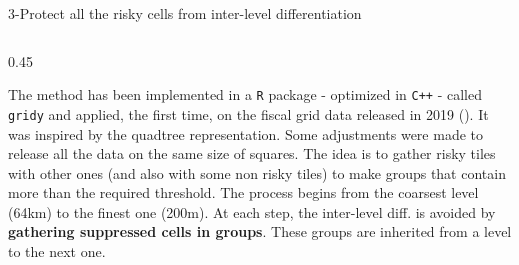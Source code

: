 \documentclass[final,xcolor={dvipsnames,svgnames,table}]{beamer}
\newlength{\colwidth}
\begin{document}
\begin{frame}[fragile,t]
\begin{columns}[t]
\begin{column}{\colwidth}

        


\vspace{1cm}

 \begin{block}{3-Protect all the risky cells from inter-level differentiation}
    \vspace{0.25cm}
    \begin{columns}
        \begin{column}{0.45\colwidth}
            \justifying
            
            The method has been implemented in a \texttt{R} package - optimized in \texttt{C++} - called \texttt{gridy} and applied, the first time, on the fiscal grid data released in 2019 (\cite{gs2018}). It was inspired by the quadtree representation. Some adjustments were made to release all the data on the same size of squares. 
            \newline
            The idea is to gather risky tiles with other ones (and also with some non risky tiles) to make groups that contain more than the required threshold. The process begins from the coarsest level (64km) to the finest one (200m). At each step, the inter-level diff. is avoided by \textbf{gathering suppressed cells in groups}. These groups are inherited from a level to the next one.
            
        \end{column}

        \hfill


\end{columns}
\end{block}
\end{column}
\end{columns}
\end{frame}
\end{document}

